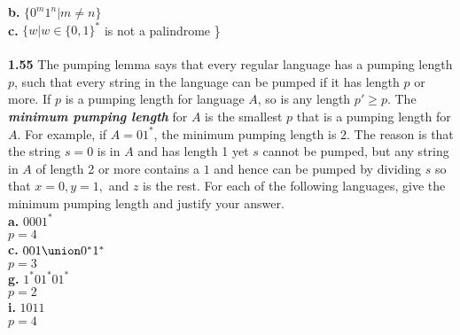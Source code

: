 \documentclass{article}
\begin{document}
{\bf b.} $\{0^{m}1^{n} | m \neq n\}$\\
{\bf c.} $\{w | w \in \{0,1\}^{*} $ is not a palindrome \} \\
\\
{\bf 1.55} The pumping lemma says that every regular language has a pumping length $p$, such that every string in the language can be pumped if it has length $p$ or more. If $p$ is a pumping length for language $A$, so is any length $p' \geq p$. The {\bf {\em minimum pumping length}} for $A$ is the smallest $p$ that is a pumping length for $A$. For example, if $A = 01^{*}$, the minimum pumping length is 2. The reason is that the string $s=0$ is in $A$ and has length 1 yet $s$ cannot be pumped, but any string in $A$ of length 2 or more contains a $1$ and hence can be pumped by dividing $s$ so that $x=0, y = 1,$ and $z$ is the rest. For each of the following languages, give the minimum pumping length and justify your answer.
\\{\bf a.} $0001^{*}$
\\$p=4$
\\{\bf c.} $001 \union 0^{*}1^{*}$
\\$p=3$
\\{\bf g.} $1^{*}01^{*}01^{*}$
\\$p=2$
\\{\bf i.} $1011$
\\$p=4$
\end{document}
